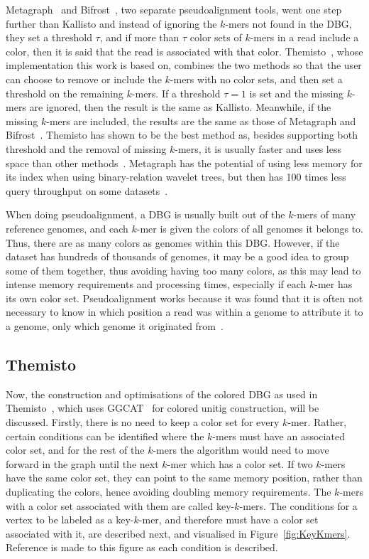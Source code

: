 Metagraph~\cite{Metagraph} and Bifrost~\cite{Bifrost}, two separate pseudoalignment tools, went one step further than Kallisto and instead of ignoring the $k$-mers not found in the DBG, they set a threshold $\tau$, and if more than $\tau$ color sets of $k$-mers in a read include a color, then it is said that the read is associated with that color.
Themisto~\cite{Themisto}, whose implementation this work is based on, combines the two methods so that the user can choose to remove or include the $k$-mers with no color sets, and then set a threshold on the remaining $k$-mers.
If a threshold $\tau=1$ is set and the missing $k$-mers are ignored, then the result is the same as Kallisto.
Meanwhile, if the missing $k$-mers are included, the results are the same as those of Metagraph and Bifrost~\cite{Themisto}.
Themisto has shown to be the best method as, besides supporting both threshold and the removal of missing $k$-mers, it is usually faster and uses less space than other methods~\cite{Themisto}.
Metagraph has the potential of using less memory for its index when using binary-relation wavelet trees, but then has 100 times less query throughput on some datasets~\cite{Themisto}.

When doing pseudoalignment, a DBG is usually built out of the $k$-mers of many reference genomes, and each $k$-mer is given the colors of all genomes it belongs to.
Thus, there are as many colors as genomes within this DBG.
However, if the dataset has hundreds of thousands of genomes, it may be a good idea to group some of them together, thus avoiding having too many colors, as this may lead to intense memory requirements and processing times, especially if each $k$-mer has its own color set.
Pseudoalignment works because it was found that it is often not necessary to know in which position a read was within a genome to attribute it to a genome, only which genome it originated from~\cite{Kallisto}.

\subsection{Themisto}

Now, the construction and optimisations of the colored DBG as used in Themisto~\cite{Themisto}, which uses GGCAT~\cite{GGCAT} for colored unitig construction, will be discussed.
Firstly, there is no need to keep a color set for every $k$-mer.
Rather, certain conditions can be identified where the $k$-mers must have an associated color set, and for the rest of the $k$-mers the algorithm would need to move forward in the graph until the next $k$-mer which has a color set.
If two $k$-mers have the same color set, they can point to the same memory position, rather than duplicating the colors, hence avoiding doubling memory requirements.
The $k$-mers with a color set associated with them are called key-$k$-mers.
The conditions for a vertex to be labeled as a key-$k$-mer, and therefore must have a color set associated with it, are described next, and visualised in Figure~\ref{fig:KeyKmers}.
Reference is made to this figure as each condition is described.

